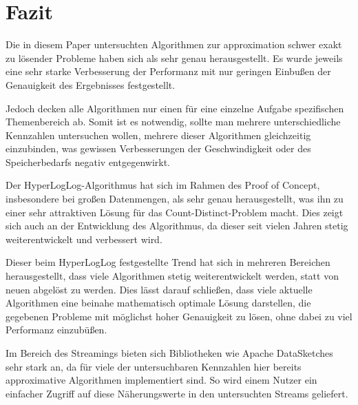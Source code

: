 \section{Fazit}

Die in diesem Paper untersuchten Algorithmen zur approximation schwer exakt zu lösender Probleme haben sich als sehr genau herausgestellt.
Es wurde jeweils eine sehr starke Verbesserung der Performanz mit nur geringen Einbußen der Genauigkeit des Ergebnisses festgestellt.

Jedoch decken alle Algorithmen nur einen für eine einzelne Aufgabe spezifischen Themenbereich ab.
Somit ist es notwendig, sollte man mehrere unterschiedliche Kennzahlen untersuchen wollen, mehrere dieser Algorithmen gleichzeitig einzubinden, was gewissen Verbesserungen der Geschwindigkeit oder des Speicherbedarfs negativ entgegenwirkt.

Der HyperLogLog-Algorithmus hat sich im Rahmen des Proof of Concept, insbesondere bei großen Datenmengen, als sehr genau herausgestellt, was ihn zu einer sehr attraktiven Lösung für das Count-Distinct-Problem macht.
Dies zeigt sich auch an der Entwicklung des Algorithmus, da dieser seit vielen Jahren stetig weiterentwickelt und verbessert wird.

Dieser beim HyperLogLog festgestellte Trend hat sich in mehreren Bereichen herausgestellt, dass viele Algorithmen stetig weiterentwickelt werden, statt von neuen abgelöst zu werden.
Dies lässt darauf schließen, dass viele aktuelle Algorithmen eine beinahe mathematisch optimale Lösung darstellen, die gegebenen Probleme mit möglichst hoher Genauigkeit zu lösen, ohne dabei zu viel Performanz einzubüßen.

Im Bereich des Streamings bieten sich Bibliotheken wie Apache DataSketches sehr stark an, da für viele der untersuchbaren Kennzahlen hier bereits approximative Algorithmen implementiert sind.
So wird einem Nutzer ein einfacher Zugriff auf diese Näherungswerte in den untersuchten Streams geliefert.